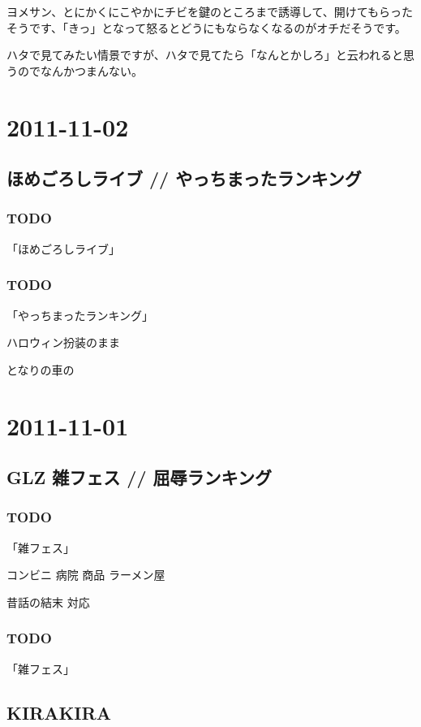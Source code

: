 \documentclass[11pt]{article}
\begin{document}
ヨメサン、とにかくにこやかにチビを鍵のところまで誘導して、開けてもらったそうです、「きっ」となって怒るとどうにもならなくなるのがオチだそうです。

ハタで見てみたい情景ですが、ハタで見てたら「なんとかしろ」と云われると思うのでなんかつまんない。
\section{2011-11-02}
\label{sec-45}
\subsection{ほめごろしライブ // やっちまったランキング}
\label{sec-45_1}
\subsubsection{\textbf{TODO}}
\label{sec-45_1_1}

「ほめごろしライブ」
\subsubsection{\textbf{TODO}}
\label{sec-45_1_2}

「やっちまったランキング」

ハロウィン扮装のまま

となりの車の
\section{2011-11-01}
\label{sec-46}
\subsection{GLZ 雑フェス // 屈辱ランキング}
\label{sec-46_1}
\subsubsection{\textbf{TODO}}
\label{sec-46_1_1}

「雑フェス」

コンビニ
病院
商品
ラーメン屋

昔話の結末
対応
\subsubsection{\textbf{TODO}}
\label{sec-46_1_2}

「雑フェス」
\subsection{KIRAKIRA}
\label{sec-46_2}
\end{document}
